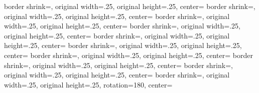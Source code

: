 {  {%
  border shrink=\pgfpageoptionborder,%
  original width=.25\pgfpageoptionheight,%
  original height=.25\pgfpageoptionwidth,%
  center=\pgfpoint{.75\pgfphysicalwidth}{.75\pgfphysicalheight}%
  }%
  {%
  border shrink=\pgfpageoptionborder,%
  original width=.25\pgfpageoptionheight,%
  original height=.25\pgfpageoptionwidth,%
  center=\pgfpoint{0\pgfphysicalwidth}{.5\pgfphysicalheight}%
  }%
  {%
  border shrink=\pgfpageoptionborder,%
  original width=.25\pgfpageoptionheight,%
  original height=.25\pgfpageoptionwidth,%
  center=\pgfpoint{.25\pgfphysicalwidth}{.5\pgfphysicalheight}%
  }%
  {%
  border shrink=\pgfpageoptionborder,%
  original width=.25\pgfpageoptionheight,%
  original height=.25\pgfpageoptionwidth,%
  center=\pgfpoint{.5\pgfphysicalwidth}{.5\pgfphysicalheight}%
  }%
  {%
  border shrink=\pgfpageoptionborder,%
  original width=.25\pgfpageoptionheight,%
  original height=.25\pgfpageoptionwidth,%
  center=\pgfpoint{.75\pgfphysicalwidth}{.5\pgfphysicalheight}%
  }%
  {%
  border shrink=\pgfpageoptionborder,%
  original width=.25\pgfpageoptionheight,%
  original height=.25\pgfpageoptionwidth,%
  center=\pgfpoint{0\pgfphysicalwidth}{.25\pgfphysicalheight}%
  }%
  {%
  border shrink=\pgfpageoptionborder,%
  original width=.25\pgfpageoptionheight,%
  original height=.25\pgfpageoptionwidth,%
  center=\pgfpoint{.25\pgfphysicalwidth}{.25\pgfphysicalheight}%
  }%
  {%
  border shrink=\pgfpageoptionborder,%
  original width=.25\pgfpageoptionheight,%
  original height=.25\pgfpageoptionwidth,%
  center=\pgfpoint{.5\pgfphysicalwidth}{.25\pgfphysicalheight}%
  }%
  {%
  border shrink=\pgfpageoptionborder,%
  original width=.25\pgfpageoptionheight,%
  original height=.25\pgfpageoptionwidth,%
  center=\pgfpoint{.75\pgfphysicalwidth}{.25\pgfphysicalheight}%
  }%
%
%
  {%
	border shrink=\pgfpageoptionborder,%
	original width=.25\pgfpageoptionheight,%
	original height=.25\pgfpageoptionwidth,%
	rotation=180,%
	center=\pgfpoint{1\pgfphysicalwidth}{.75\pgfphysicalheight}%
  }%
}
